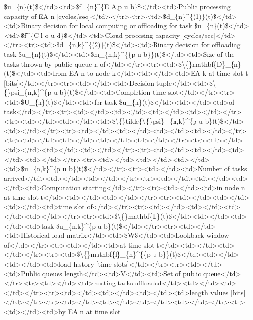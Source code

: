 \documentclass{article}
\begin{document}
\$u\_\{n\}(t)\$</td><td>\$f\_\{n\}\textasciicircum{}\{E A,p u b\}\$</td><td>Public processing capacity of EA n [cycles/sec]</td></tr><tr><td>\$d\_\{n\}\textasciicircum{}\{(1)\}(t)\$</td><td>Binary decision for local computing or offloading for task \$u\_\{n\}(t)\$</td><td>\$f\textasciicircum{}\{C l o u d\}\$</td><td>Cloud procesing capacity [cycles/sec]</td></tr><tr><td>\$d\_\{n,k\}\textasciicircum{}\{(2)\}(t)\$</td><td>Binary decision for offloading task \$u\_\{n\}(t)\$</td><td>\$m\_\{n,k\}\textasciicircum{}\{\{p u b\}\}(t)\$</td><td>Size of the tasks thrown by public queue n of</td></tr><tr><td>\$\textbackslash\{\}mathbf\{D\}\_\{n\}(t)\$</td><td>from EA n to node k</td><td></td><td>EA k at time slot t [bits]</td></tr><tr><td></td><td>Decision tuple</td><td>\$\textbackslash\{\}psi\_\{n,k\}\textasciicircum{}\{p u b\}(t)\$</td><td>Completion time slot</td></tr><tr><td>\$U\_\{n\}(t)\$</td><td>for task \$u\_\{n\}(t)\$</td><td></td><td>of task</td></tr><tr><td></td><td></td><td></td><td></td></tr><tr><td></td><td></td><td>\$\textbackslash\{\}tilde\{\textbackslash\{\}psi\}\_\{n,k\}\textasciicircum{}\{p u b\}(t)\$</td><td></td></tr><tr><td></td><td></td><td></td><td></td></tr><tr><td></td><td></td><td></td><td></td></tr><tr><td></td><td></td><td></td><td></td></tr><tr><td></td><td></td><td></td><td></td></tr><tr><td></td><td></td><td></td><td>\$u\_\{n,k\}\textasciicircum{}\{p u b\}(t)\$</td></tr><tr><td></td><td>Number of tasks arrived</td><td></td><td></td></tr><tr><td></td><td></td><td></td><td>Computation starting</td></tr><tr><td></td><td>in node n at time slot t</td><td></td><td></td></tr><tr><td></td><td></td><td></td><td>time slot of</td></tr><tr><td></td><td></td><td></td><td></td></tr><tr><td>\$\textbackslash\{\}mathbf\{L\}(t)\$</td><td></td><td></td><td>task \$u\_\{n,k\}\textasciicircum{}\{p u b\}(t)\$</td></tr><tr><td></td><td>Historical load matrix</td><td>\$W\$</td><td>Lookback window of</td></tr><tr><td></td><td>at time slot t</td><td></td><td></td></tr><tr><td>\$\textbackslash\{\}mathbf\{l\}\_\{n\}\textasciicircum{}\{\{p u b\}\}(t)\$</td><td></td><td></td><td>load history [time slots]</td></tr><tr><td></td><td>Public queues length</td><td>V</td><td>Set of public queue</td></tr><tr><td></td><td>hosting tasks offloaded</td><td></td><td></td></tr><tr><td></td><td></td><td></td><td>length values [bits]</td></tr><tr><td></td><td></td><td></td><td></td></tr><tr><td></td><td>by EA n at time slot 
\end{document}
